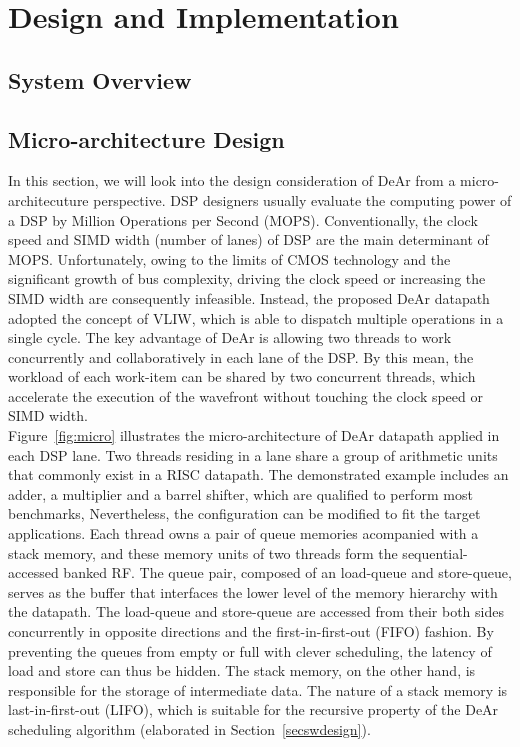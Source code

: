 \chapter{Design and Implementation}
    \section{System Overview}
    \section{Micro-architecture Design}
        In this section, we will look into the design consideration of DeAr from a micro-architecuture perspective.
        DSP designers usually evaluate the computing power of a DSP by Million Operations per Second (MOPS).
        Conventionally, the clock speed and SIMD width (number of lanes) of DSP are the main determinant of MOPS.
        Unfortunately, owing to the limits of CMOS technology and the significant growth of bus complexity, 
        driving the clock speed or increasing the SIMD width are consequently infeasible.
        Instead, the proposed DeAr datapath adopted the concept of VLIW, 
        which is able to dispatch multiple operations in a single cycle.
        The key advantage of DeAr is allowing two threads to work concurrently and collaboratively in each lane of the DSP.
        By this mean, the workload of each work-item can be shared by two concurrent threads, 
        which accelerate the execution of the wavefront without touching the clock speed or SIMD width.
        \\\indent
        Figure~\ref{fig:micro} illustrates the micro-architecture of DeAr datapath applied in each DSP lane.
        Two threads residing in a lane share a group of arithmetic units that commonly exist in a RISC datapath.
        The demonstrated example includes an adder, a multiplier and a barrel shifter, which are qualified to perform most benchmarks,
        Nevertheless, the configuration can be modified to fit the target applications.
        Each thread owns a pair of queue memories acompanied with a stack memory, 
        and these memory units of two threads form the sequential-accessed banked RF.
        The queue pair, composed of an load-queue and store-queue, 
        serves as the buffer that interfaces the lower level of the memory hierarchy with the datapath.
        The load-queue and store-queue are accessed from their both sides concurrently in opposite directions and the first-in-first-out (FIFO) fashion.
        By preventing the queues from empty or full with clever scheduling,
        the latency of load and store can thus be hidden.
        The stack memory, on the other hand, is responsible for the storage of intermediate data.
        The nature of a stack memory is last-in-first-out (LIFO), 
        which is suitable for the recursive property of the DeAr scheduling algorithm (elaborated in Section~\ref{secswdesign}).
        


